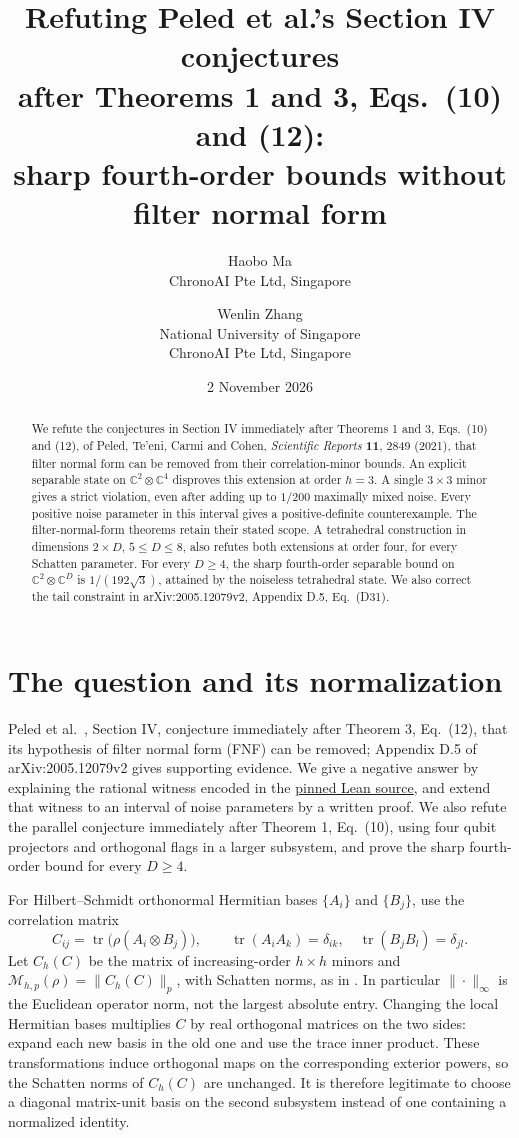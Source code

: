 \documentclass[11pt]{article}
\title{Refuting Peled et al.'s Section IV conjectures\\
after Theorems 1 and 3, Eqs.\ (10) and (12):\\
sharp fourth-order bounds without filter normal form}
\author{Haobo Ma\\\small ChronoAI Pte Ltd, Singapore
\and Wenlin Zhang\\\small National University of Singapore\\
\small ChronoAI Pte Ltd, Singapore}
\date{2 November 2026}
\newcommand{\tr}{\operatorname{tr}}
\newcommand{\CM}{\mathcal M}
\begin{document}
\maketitle
\begin{abstract}
We refute the conjectures in Section IV immediately after Theorems 1 and 3,
Eqs.~(10) and (12), of Peled,
Te'eni, Carmi and Cohen, \emph{Scientific Reports} \textbf{11}, 2849
(2021), that filter normal form can be removed from their correlation-minor bounds.
An explicit separable state on $\mathbb C^2\otimes\mathbb C^4$ disproves
this extension at order $h=3$.
A single $3\times3$ minor gives a strict violation, even after adding
up to $1/200$ maximally mixed noise.
Every positive noise parameter in this interval gives a positive-definite
counterexample. The filter-normal-form theorems retain their stated scope.
A tetrahedral construction in dimensions $2\times D$, $5\le D\le8$,
also refutes both extensions at order four, for every Schatten parameter.
For every $D\ge4$, the sharp fourth-order separable bound on
$\mathbb C^2\otimes\mathbb C^D$ is $1/(192\sqrt3)$, attained by the
noiseless tetrahedral state. We also correct the tail constraint in
arXiv:2005.12079v2, Appendix D.5, Eq.~(D31).
\end{abstract}

\section{The question and its normalization}
Peled et al.~\cite{peled}, Section IV, conjecture immediately after
Theorem 3, Eq.~(12), that its hypothesis of filter normal form (FNF) can be removed;
Appendix D.5 of arXiv:2005.12079v2 gives supporting evidence.
We give a negative answer by explaining the rational witness encoded in
the \href{https://github.com/the-omega-institute/trureturing/blob/0f1f822c673c1903dc6b0a209a23dacebca2aa6c/D5/S3/Quantum/Entanglement/Witness/CorrelationMinorNormFNFRefutation.lean}{pinned Lean source},
and extend that witness to an interval of noise parameters by a written proof.
We also refute the parallel conjecture immediately after Theorem 1, Eq.~(10),
using four qubit projectors and orthogonal flags in a larger subsystem,
and prove the sharp fourth-order bound for every $D\ge4$.

For Hilbert--Schmidt orthonormal Hermitian bases $\{A_i\}$ and $\{B_j\}$,
use the correlation matrix
\[
 C_{ij}=\tr\bigl(\rho(A_i\otimes B_j)\bigr),\qquad
 \tr(A_iA_k)=\delta_{ik},\quad \tr(B_jB_l)=\delta_{jl}.
\]
Let $C_h(C)$ be the matrix of increasing-order $h\times h$ minors and
$\CM_{h,p}(\rho)=\|C_h(C)\|_p$, with Schatten norms, as in
\cite[Section III, Eqs.~(6)--(8)]{peled}. In particular $\|\cdot\|_\infty$
is the Euclidean operator norm, not the largest absolute entry.
Changing the local Hermitian bases multiplies $C$ by real orthogonal
matrices on the two sides: expand each new basis in the old one and use
the trace inner product. These transformations induce orthogonal maps
on the corresponding exterior powers, so the Schatten norms of $C_h(C)$
are unchanged. It is therefore legitimate to choose a diagonal matrix-unit
basis on the second subsystem instead of one containing a normalized identity.
\end{document}
